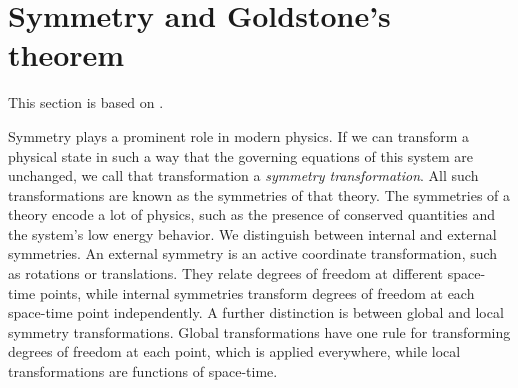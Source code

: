 \section{Symmetry and Goldstone's theorem}
\label{section:symmetry}

This section is based on \cite{weinberg_1995,weinberg_1996_vol2,Peskin:IntroQFT,smooth_manifolds}.

Symmetry plays a prominent role in modern physics.
If we can transform a physical state in such a way that the governing equations of this system are unchanged, we call that transformation a \emph{symmetry transformation}.
All such transformations are known as the symmetries of that theory.
The symmetries of a theory encode a lot of physics, such as the presence of conserved quantities and the system's low energy behavior.
We distinguish between internal and external symmetries.
An external symmetry is an active coordinate transformation, such as rotations or translations.
They relate degrees of freedom at different space-time points, while internal symmetries transform degrees of freedom at each space-time point independently.
A further distinction is between global and local symmetry transformations.
Global transformations have one rule for transforming degrees of freedom at each point, which is applied everywhere, while local transformations are functions of space-time.

